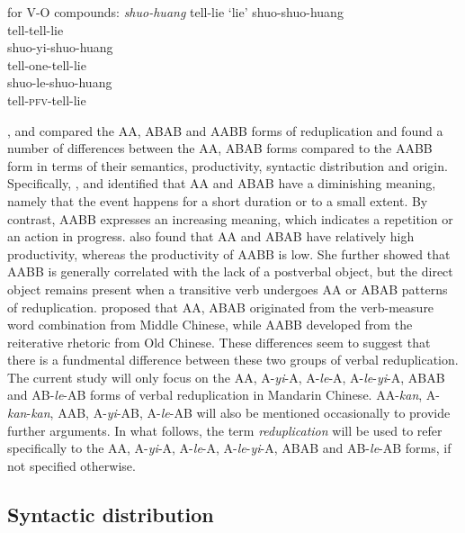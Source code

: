 \ex\label{ex:forms-vo} for V-O compounds: \textit{shuo-huang} tell-lie `lie'
		\ea \gll shuo-shuo-huang\\
		tell-tell-lie\\ 
		\ex \gll shuo-yi-shuo-huang\\
		tell-one-tell-lie\\ 
		\ex \gll shuo-le-shuo-huang\\
		tell-\textsc{pfv}-tell-lie\\ 
		\z
\z




 \citet{Fan1964}, \citet{Arcodiaetal2014}  and \citet{Xie2020} compared the AA, ABAB and AABB forms of reduplication 
and found a number of differences between the AA, ABAB forms compared to the AABB form in terms of their semantics, productivity, syntactic distribution and origin. 
Specifically, \citet[17--18]{Arcodiaetal2014}, \citet[144]{MelloniBasciano2018} and \citet[90]{Xie2020} identified that AA and ABAB have a diminishing meaning, 
namely that the event happens for a short duration or to a small extent. 
By contrast, AABB expresses an increasing meaning, which indicates a repetition or an action in progress. 
\citet[Sec. 3.1]{Xie2020} also found that AA and ABAB have relatively high productivity, 
whereas the productivity of AABB is low. 
She further showed that AABB is generally correlated with the lack of a postverbal object, but the direct object remains present when a transitive verb undergoes AA or ABAB patterns of reduplication. 
\citet[277]{Fan1964} proposed that AA, ABAB originated from the verb-measure word combination from Middle Chinese, 
while AABB developed from the reiterative rhetoric from Old Chinese. 
These differences seem to suggest that there is a fundmental difference between these two groups of verbal reduplication. 
The current study will only focus on the AA, A-\textit{yi}-A, A-\textit{le}-A, A-\textit{le}-\textit{yi}-A, ABAB and AB-\textit{le}-AB forms of verbal reduplication in Mandarin Chinese.
AA-\textit{kan}, A-\textit{kan}-\textit{kan}, AAB, A-\textit{yi}-AB, A-\textit{le}-AB will also be mentioned occasionally to provide further arguments.
In what follows, the term \textit{reduplication} will be used  to refer specifically to the AA, A\hyp{}\textit{yi}\hyp{}A, A-\textit{le}-A, A-\textit{le}-\textit{yi}-A, ABAB and AB-\textit{le}-AB forms, if not specified otherwise.




\subsection{Syntactic distribution}\label{sec:syn-dis}

